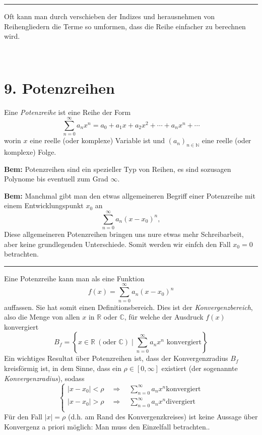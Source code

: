 \documentclass[a4paper,landscape,8pt]{extarticle}
\newcommand{\N}{\mathbb{N}}
\newcommand{\R}{\mathbb{R}}
\newcommand{\C}{\mathbb{C}}
\newcommand{\abs}[1]{\left\lvert #1 \right\rvert}
\newcommand{\sep}{\vspace{5pt}\noindent\hrule\vspace{5pt}}
\newcommand{\Bem}{\textbf{Bem: }}
\renewcommand*{\newpage}{ \ }
\begin{document}
\begin{multicols*}{4}
\begin{warmup}
\sep
\end{warmup}

\Trick Oft kann man durch verschieben der Indizes und herausnehmen von
Reihengliedern die Terme so umformen, dass die Reihe einfacher zu berechnen
wird.


\newpage

\section{9. Potenzreihen}

\begin{warmup}
\Def Eine \emph{Potenzreihe} ist eine Reihe der Form
\[
\sum_{n=0}^\infty a_n x^n = a_0 + a_1x + a_2 x^2 + \cdots + a_n x^n + \cdots
\]
worin $x$ eine reelle (oder komplexe) Variable ist und $(a_n)_{n\in \N}$ eine
reelle (oder komplexe) Folge.

\Bem Potenzreihen sind ein spezieller Typ von Reihen, es sind sozusagen Polynome
bis eventuell zum Grad $\infty$.

\Bem Manchmal gibt man den etwas allgemeineren Begriff einer Potenzreihe mit
einem Entwicklungspunkt $x_0$ an
\[
\sum_{n=0}^\infty a_n (x-x_0)^n,
\]
Diese allgemeineren Potenzreihen bringen uns nure etwas mehr Schreibarbeit, aber
keine grundlegenden Unterschiede. Somit werden wir einfch den Fall $x_0 =
0$ betrachten.

\sep

\end{warmup}

\Def Eine Potenzreihe kann man als eine Funktion 
\[
f(x)=\sum_{n=0}^\infty a_n
(x-x_0)^n
\]
auffassen. Sie hat somit einen Definitionsbereich. Dies ist der
\emph{Konvergenzbereich}, also die Menge von allen $x$ in $\R$ oder $\C$, für
welche der Ausdruck $f(x)$ konvergiert
\[
B_f = \left\{x \in \R \ (\text{oder } \C) \mid \sum_{n=0}^\infty a_n
x^n \text{ konvergiert}\right\}
\]
Ein wichtiges Resultat über Potenzreihen ist, dass der Konvergenzradius $B_f$
kreisförmig ist, in dem Sinne, dass ein $\rho \in [0,\infty]$ existiert (der
sogenannte \emph{Konvergenzradius}), sodass
\[
\begin{cases}
\abs{x-x_0}< \rho \quad \Longrightarrow \quad \sum_{n=0}^\infty a_nx^n \text{
konvergiert}\\
\abs{x-x_0}> \rho \quad \Longrightarrow \quad \sum_{n=0}^\infty a_nx^n \text{
divergiert}\\
\end{cases}
\]
Für den Fall $\abs{x}=\rho$ (d.h. am Rand des Konvergenzkreises) ist keine
Aussage über Konvergenz a priori möglich: Man muss den Einzelfall betrachten..


\end{multicols*}
\end{document}
